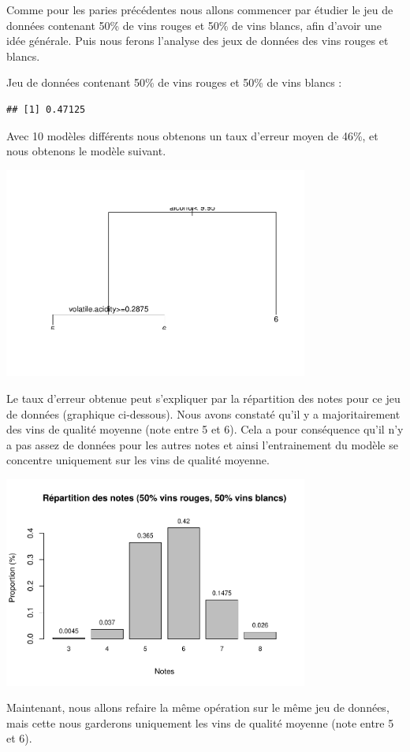 \documentclass[
]{article}
\begin{document}
Comme pour les paries précédentes nous allons commencer par étudier le
jeu de données contenant 50\% de vins rouges et 50\% de vins blancs,
afin d'avoir une idée générale. Puis nous ferons l'analyse des jeux de
données des vins rouges et blancs.

Jeu de données contenant 50\% de vins rouges et 50\% de vins blancs :

\begin{verbatim}
## [1] 0.47125
\end{verbatim}

Avec 10 modèles différents nous obtenons un taux d'erreur moyen de 46\%,
et nous obtenons le modèle suivant.

\begin{center}
	\includegraphics[width=10cm]{repport_files/figure-latex/unnamed-chunk-17-1.pdf}
\end{center}

Le taux d'erreur obtenue peut s'expliquer par la répartition des notes
pour ce jeu de données (graphique ci-dessous). Nous avons constaté qu'il
y a majoritairement des vins de qualité moyenne (note entre 5 et 6).
Cela a pour conséquence qu'il n'y a pas assez de données pour les autres
notes et ainsi l'entrainement du modèle se concentre uniquement sur les
vins de qualité moyenne.

\begin{center}
	\includegraphics[width=10cm]{repport_files/figure-latex/unnamed-chunk-18-1.pdf}
\end{center}
Maintenant, nous allons refaire la même opération sur le même jeu de
données, mais cette nous garderons uniquement les vins de qualité
moyenne (note entre 5 et 6).
\end{document}
